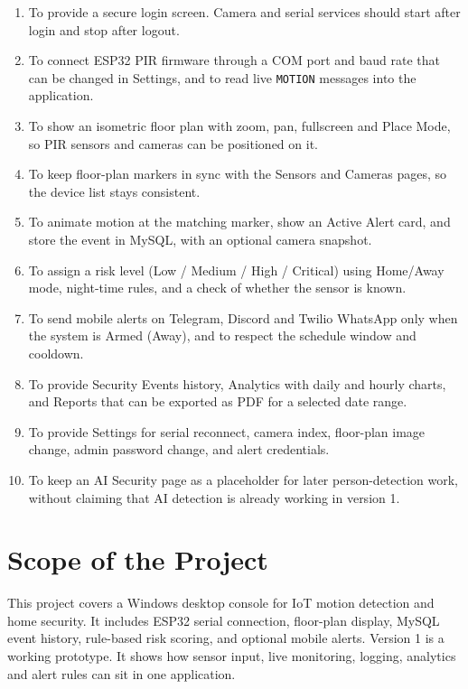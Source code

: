 \documentclass[12pt,a4paper]{report}
\begin{document}
\begin{enumerate}
\item To provide a secure login screen. Camera and serial services should start after login and stop after logout.

\item To connect ESP32 PIR firmware through a COM port and baud rate that can be changed in Settings, and to read live \texttt{MOTION} messages into the application.

\item To show an isometric floor plan with zoom, pan, fullscreen and Place Mode, so PIR sensors and cameras can be positioned on it.

\item To keep floor-plan markers in sync with the Sensors and Cameras pages, so the device list stays consistent.

\item To animate motion at the matching marker, show an Active Alert card, and store the event in MySQL, with an optional camera snapshot.

\item To assign a risk level (Low / Medium / High / Critical) using Home/Away mode, night-time rules, and a check of whether the sensor is known.

\item To send mobile alerts on Telegram, Discord and Twilio WhatsApp only when the system is Armed (Away), and to respect the schedule window and cooldown.

\item To provide Security Events history, Analytics with daily and hourly charts, and Reports that can be exported as PDF for a selected date range.

\item To provide Settings for serial reconnect, camera index, floor-plan image change, admin password change, and alert credentials.

\item To keep an AI Security page as a placeholder for later person-detection work, without claiming that AI detection is already working in version 1.
\end{enumerate}

\section{Scope of the Project}

This project covers a Windows desktop console for IoT motion detection and home security. It includes ESP32 serial connection, floor-plan display, MySQL event history, rule-based risk scoring, and optional mobile alerts. Version 1 is a working prototype. It shows how sensor input, live monitoring, logging, analytics and alert rules can sit in one application.
\end{document}
